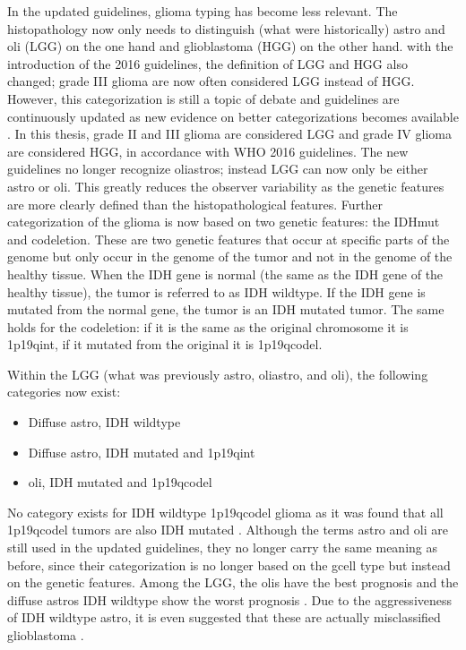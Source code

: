 In the updated guidelines, \gls{glioma} typing has become less relevant.
The histopathology now only needs to distinguish (what were historically) \gls{astro} and \gls{oli} (\gls{LGG}) on the one hand and \gls{glioblastoma} (\gls{HGG}) on the other hand.
with the introduction of the 2016 guidelines, the definition of \gls{LGG} and \gls{HGG} also changed; grade III \gls{glioma} are now often considered \gls{LGG} instead of \gls{HGG}.
However, this categorization is still a topic of debate and guidelines are continuously updated as new evidence on better categorizations becomes available \autocite{lous2020impactnow}.
In this thesis, grade II and III \gls{glioma} are considered \gls{LGG} and grade IV \gls{glioma} are considered \gls{HGG}, in accordance with \gls{WHO} 2016 guidelines.
The new guidelines no longer recognize \glspl{oliastro}; instead \gls{LGG} can now only be either \gls{astro} or \gls{oli}.
This greatly reduces the observer variability as the genetic features are more clearly defined than the histopathological features.
Further categorization of the \gls{glioma} is now based on two genetic features:  the \gls{IDHmut} and \gls{codeletion}.
These are two genetic features that occur at specific parts of the genome but only occur in the genome of the \gls{tumor} and not in the genome of the healthy tissue.
When the \gls{IDH} gene is normal (the same as the \gls{IDH} gene of the healthy tissue), the \gls{tumor} is referred to as \gls{IDH} wildtype.
If the \gls{IDH} gene is mutated from the normal gene, the \gls{tumor} is an \gls{IDH} mutated \gls{tumor}.
The same holds for the \gls{codeletion}: if it is the same as the original chromosome it is \acl{1p19qint}, if it mutated from the original it is \acl{1p19qcodel}.

Within the \gls{LGG} (what was previously \gls{astro}, \gls{oliastro}, and \gls{oli}), the following categories now exist:
\begin{itemize}
    \item Diffuse \gls{astro}, \gls{IDH} wildtype
    \item Diffuse \gls{astro}, \gls{IDH} mutated and \acl{1p19qint}
    \item \Gls{oli}, \gls{IDH} mutated and \acl{1p19qcodel}
\end{itemize}
No category exists for \gls{IDH} wildtype \acl{1p19qcodel} \gls{glioma} as it was found that all \acl{1p19qcodel} \glspl{tumor} are also \gls{IDH} mutated \autocite{labussi20101p19qcodeletedIDH}.
Although the terms \gls{astro} and \gls{oli} are still used in the updated guidelines, they no longer carry the same meaning as before, since their categorization is no longer based on the \gls{gcell} type but instead on the genetic features.
Among the \gls{LGG}, the \glspl{oli} have the best prognosis and the diffuse \glspl{astro} \gls{IDH} wildtype show the worst prognosis \autocite{eckel2015gliomagroups}.
Due to the aggressiveness of \gls{IDH} wildtype \gls{astro}, it is even suggested that these are actually misclassified \gls{glioblastoma} \autocite{hartmann2010IDH1gbm, brat2018IMPACT}.




